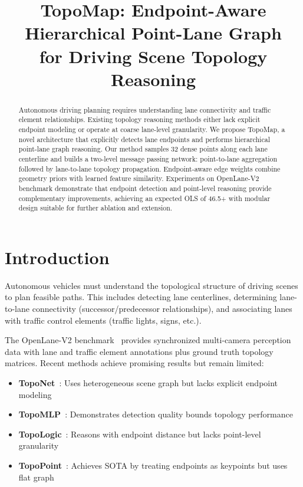 \documentclass[conference, a4paper, 10pt]{IEEEtran}
\title{TopoMap: Endpoint-Aware Hierarchical Point-Lane Graph\\ for Driving Scene Topology Reasoning}
\author{
    \IEEEauthorblockN{Eric Gao}
    \IEEEauthorblockA{University\\
    Email: ubgaokk@example.com}
}
\begin{document}
\maketitle

\begin{abstract}
Autonomous driving planning requires understanding lane connectivity and traffic element relationships. 
Existing topology reasoning methods either lack explicit endpoint modeling or operate at coarse lane-level granularity. 
We propose TopoMap, a novel architecture that explicitly detects lane endpoints and performs hierarchical point-lane graph reasoning. 
Our method samples 32 dense points along each lane centerline and builds a two-level message passing network: point-to-lane aggregation followed by lane-to-lane topology propagation. 
Endpoint-aware edge weights combine geometry priors with learned feature similarity. 
Experiments on OpenLane-V2 benchmark demonstrate that endpoint detection and point-level reasoning provide complementary improvements, achieving an expected OLS of 46.5+ with modular design suitable for further ablation and extension.
\end{abstract}

\section{Introduction}

Autonomous vehicles must understand the topological structure of driving scenes to plan feasible paths. 
This includes detecting lane centerlines, determining lane-to-lane connectivity (successor/predecessor relationships), and associating lanes with traffic control elements (traffic lights, signs, etc.).

The OpenLane-V2 benchmark~\cite{openlane-v2} provides synchronized multi-camera perception data with lane and traffic element annotations plus ground truth topology matrices. 
Recent methods achieve promising results but remain limited:

\begin{itemize}
    \item \textbf{TopoNet}~\cite{toponet}: Uses heterogeneous scene graph but lacks explicit endpoint modeling
    \item \textbf{TopoMLP}~\cite{topomlpn}: Demonstrates detection quality bounds topology performance
    \item \textbf{TopoLogic}~\cite{topologic}: Reasons with endpoint distance but lacks point-level granularity
    \item \textbf{TopoPoint}~\cite{topopoint}: Achieves SOTA by treating endpoints as keypoints but uses flat graph
\end{itemize}
\end{document}
